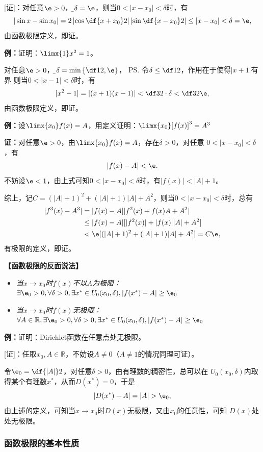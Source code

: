 [证]：对任意$\e>0$，令{\b$\delta=\e$}，则当$0<|x-x_0|<\delta$时，有
$$|\sin x-\sin x_0|=2\left|\cos\df{x+x_0}2\right|
\left|\sin\df{x-x_0}2\right|\leq|x-x_0|<\delta=\e,$$
由函数极限定义，即证。

{\bf 例：}证明：$\limx{1}x^2=1$。

对任意$\e>0$，令{\b$\delta=\min\left\{\df12,\e\right\}$}，
\ps{令$\delta\leq\df12$，作用在于使得$|x+1|$有界}
则当$0<|x-1|<\delta$时，有
$$|x^2-1|=|(x+1)(x-1)|<\df32\cdot\delta<\df32\e,$$
由函数极限定义，即证。

{\bf 例：}设$\limx{x_0}f(x)=A$，用定义证明：$\limx{x_0}[f(x)]^3=A^3$

{\bf 证：}对任意$\e>0$，由$\limx{x_0}f(x)=A$，存在$\delta>0$，对任意
$0<|x-x_0|<\delta$，有
$$|f(x)-A|<\e.$$
不妨设$\e<1$，由上式可知$0<|x-x_0|<\delta$时，有$|f(x)|<|A|+1$。

综上，记$C=(|A|+1)^2+(|A|+1)|A|+A^2$，则当$0<|x-x_0|<\delta$时，总有
\begin{align}
	|f^3(x)-A^3|&=|f(x)-A||f^2(x)+f(x)A+A^2|\notag\\
	&\leq |f(x)-A|[|f^2(x)|+|f(x)||A|+A^2]\notag\\
	&<\e[(|A|+1)^2+(|A|+1)|A|+A^2]=C\e\notag,
\end{align}
有极限的定义，即证。

\begin{shaded}
	{\bf 【函数极限的反面说法】}
	
	\begin{itemize}
	  \item {\it 当$x\to x_0$时$f(x)$不以$A$为极限：} 
	    $\exists\e_0>0,\forall\delta>0, \exists x^*\in
	    U_0(x_0,\delta),|f(x^*)-A|\geq\e_0$ 
	  \item {\it 当$x\to x_0$时$f(x)$无极限：}
		$\forall A\in\mathbb{R},\exists\e_0>0,\forall\delta>0, \exists x^*\in
	    U_0(x_0,\delta),|f(x^*)-A|\geq\e_0$ 
	\end{itemize}
	
	{\bf 例：}证明：Dirichlet函数在任意点处无极限。
	
	[证]：任取$x_0,A\in\mathbb{R}$，不妨设$A\ne 0$（$A\ne 1$的情况同理可证）。
	
	令$\e_0=\df{|A|}2$，对任意$\delta>0$，由有理数的稠密性，总可以在
	$U_0(x_0,\delta)$内取得某个有理数$x^*$，从而$D(x^*)=0$，于是
	$$|D(x^*)-A|=|A|>\e_0,$$
	由上述的定义，可知当$x\to x_0$时$D(x)$无极限，又由$x_0$的任意性，可知
	$D(x)$处处无极限。
\end{shaded}

\subsubsection{函数极限的基本性质}

